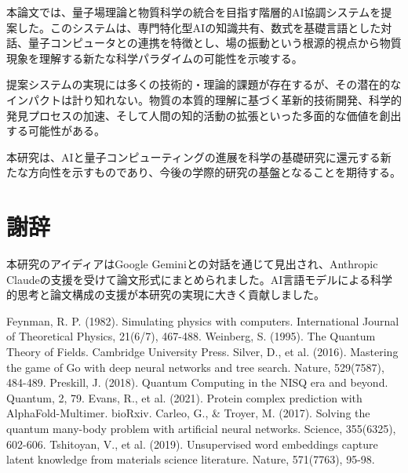 \documentclass[12pt,a4paper]{article}
\begin{document}
本論文では、量子場理論と物質科学の統合を目指す階層的AI協調システムを提案した。このシステムは、専門特化型AIの知識共有、数式を基礎言語とした対話、量子コンピュータとの連携を特徴とし、場の振動という根源的視点から物質現象を理解する新たな科学パラダイムの可能性を示唆する。

提案システムの実現には多くの技術的・理論的課題が存在するが、その潜在的なインパクトは計り知れない。物質の本質的理解に基づく革新的技術開発、科学的発見プロセスの加速、そして人間の知的活動の拡張といった多面的な価値を創出する可能性がある。

本研究は、AIと量子コンピューティングの進展を科学の基礎研究に還元する新たな方向性を示すものであり、今後の学際的研究の基盤となることを期待する。

\section*{謝辞}
本研究のアイディアはGoogle Geminiとの対話を通じて見出され、Anthropic Claudeの支援を受けて論文形式にまとめられました。AI言語モデルによる科学的思考と論文構成の支援が本研究の実現に大きく貢献しました。

\begin{thebibliography}{99}
 Feynman, R. P. (1982). Simulating physics with computers. International Journal of Theoretical Physics, 21(6/7), 467-488.
 Weinberg, S. (1995). The Quantum Theory of Fields. Cambridge University Press.
 Silver, D., et al. (2016). Mastering the game of Go with deep neural networks and tree search. Nature, 529(7587), 484-489.
 Preskill, J. (2018). Quantum Computing in the NISQ era and beyond. Quantum, 2, 79.
 Evans, R., et al. (2021). Protein complex prediction with AlphaFold-Multimer. bioRxiv.
 Carleo, G., \& Troyer, M. (2017). Solving the quantum many-body problem with artificial neural networks. Science, 355(6325), 602-606.
 Tshitoyan, V., et al. (2019). Unsupervised word embeddings capture latent knowledge from materials science literature. Nature, 571(7763), 95-98.
\end{thebibliography}
\end{document}
